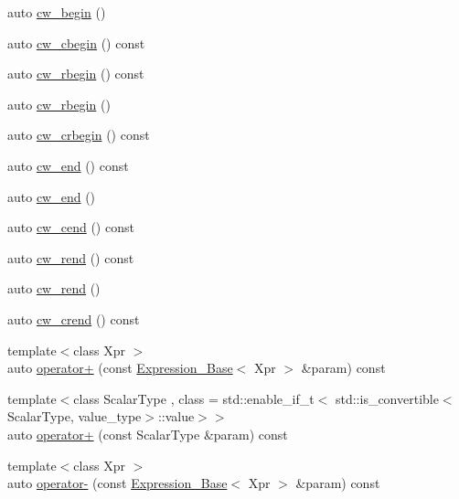 \begin{DoxyCompactItemize}
auto \hyperlink{classbc_1_1tensors_1_1Expression__Base_ae9129183e4abdaa3950568143b9deb24}{cw\+\_\+begin} ()
\item 
auto \hyperlink{classbc_1_1tensors_1_1Expression__Base_a6246c6f8d1915a71f73856965d2ed742}{cw\+\_\+cbegin} () const
\item 
auto \hyperlink{classbc_1_1tensors_1_1Expression__Base_a82c194b3f8c9e934caf0ac5e5380042a}{cw\+\_\+rbegin} () const
\item 
auto \hyperlink{classbc_1_1tensors_1_1Expression__Base_a7d23bd41c27b1a0b922a293c9bafbd50}{cw\+\_\+rbegin} ()
\item 
auto \hyperlink{classbc_1_1tensors_1_1Expression__Base_a1511fc89d5f0e43a24bbb2488193395d}{cw\+\_\+crbegin} () const
\item 
auto \hyperlink{classbc_1_1tensors_1_1Expression__Base_a4ca9ee5e831fdfa6575e34071927cc1e}{cw\+\_\+end} () const
\item 
auto \hyperlink{classbc_1_1tensors_1_1Expression__Base_a744749a4bfd3082ad2f99c8a296b4397}{cw\+\_\+end} ()
\item 
auto \hyperlink{classbc_1_1tensors_1_1Expression__Base_a7773a1dfda9698eb96513117fd55032d}{cw\+\_\+cend} () const
\item 
auto \hyperlink{classbc_1_1tensors_1_1Expression__Base_acd8f45445f2245cf879680274cc89d7f}{cw\+\_\+rend} () const
\item 
auto \hyperlink{classbc_1_1tensors_1_1Expression__Base_abcd8fcb1c7f1307fa69d59b8df34bfa3}{cw\+\_\+rend} ()
\item 
auto \hyperlink{classbc_1_1tensors_1_1Expression__Base_a787946d698c80b1a4233f64c27afbd26}{cw\+\_\+crend} () const
\item 
{\footnotesize template$<$class Xpr $>$ }\\auto \hyperlink{classbc_1_1tensors_1_1Expression__Base_a3188044d69774275c9ba53b3cd6affc8}{operator+} (const \hyperlink{classbc_1_1tensors_1_1Expression__Base}{Expression\+\_\+\+Base}$<$ Xpr $>$ \&param) const
\item 
{\footnotesize template$<$class Scalar\+Type , class  = std\+::enable\+\_\+if\+\_\+t$<$   std\+::is\+\_\+convertible$<$\+Scalar\+Type, value\+\_\+type$>$\+::value$>$$>$ }\\auto \hyperlink{classbc_1_1tensors_1_1Expression__Base_a2b29585ec1eab54f5406da087ba5565c}{operator+} (const Scalar\+Type \&param) const
\item 
{\footnotesize template$<$class Xpr $>$ }\\auto \hyperlink{classbc_1_1tensors_1_1Expression__Base_a2d0ab75e1b0693e484741721309731a6}{operator-\/} (const \hyperlink{classbc_1_1tensors_1_1Expression__Base}{Expression\+\_\+\+Base}$<$ Xpr $>$ \&param) const

\end{DoxyCompactItemize}
